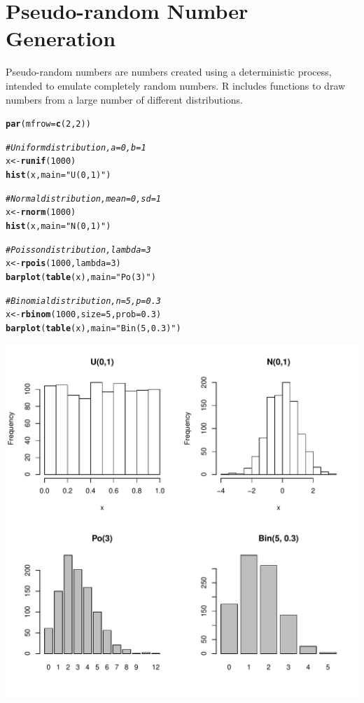 \documentclass{article}\usepackage[]{graphicx}\usepackage[]{color}
\makeatletter
\def\maxwidth{ %
  \ifdim\Gin@nat@width>\linewidth
    \linewidth
  \else
    \Gin@nat@width
  \fi
}
\newcommand{\hlnum}[1]{\textcolor[rgb]{0.686,0.059,0.569}{#1}}%
\newcommand{\hlstr}[1]{\textcolor[rgb]{0.192,0.494,0.8}{#1}}%
\newcommand{\hlcom}[1]{\textcolor[rgb]{0.678,0.584,0.686}{\textit{#1}}}%
\newcommand{\hlstd}[1]{\textcolor[rgb]{0.345,0.345,0.345}{#1}}%
\newcommand{\hlkwb}[1]{\textcolor[rgb]{0.69,0.353,0.396}{#1}}%
\newcommand{\hlkwc}[1]{\textcolor[rgb]{0.333,0.667,0.333}{#1}}%
\newcommand{\hlkwd}[1]{\textcolor[rgb]{0.737,0.353,0.396}{\textbf{#1}}}%
\newenvironment{kframe}{%
 \def\at@end@of@kframe{}%
 \ifinner\ifhmode%
  \def\at@end@of@kframe{\end{minipage}}%
  \begin{minipage}{\columnwidth}%
 \fi\fi%
 \def\FrameCommand##1{\hskip\@totalleftmargin \hskip-\fboxsep
 \colorbox{shadecolor}{##1}\hskip-\fboxsep
     \hskip-\linewidth \hskip-\@totalleftmargin \hskip\columnwidth}%
 \MakeFramed {\advance\hsize-\width
   \@totalleftmargin\z@ \linewidth\hsize
   \@setminipage}}%
 {\par\unskip\endMakeFramed%
 \at@end@of@kframe}
\newenvironment{knitrout}{}{} %
\makeatother
\begin{document}
\section{Pseudo-random Number Generation} \label{PRNG}
Pseudo-random numbers are numbers created using a deterministic process, intended to emulate completely random numbers. R includes functions to draw numbers from a large number of different distributions.
\begin{knitrout}
\color{fgcolor}\begin{kframe}
\begin{alltt}
\hlkwd{par}\hlstd{(}\hlkwc{mfrow} \hlstd{=} \hlkwd{c}\hlstd{(}\hlnum{2}\hlstd{,}\hlnum{2}\hlstd{))}

\hlcom{#Uniform distribution, a = 0, b = 1}
\hlstd{x} \hlkwb{<-} \hlkwd{runif}\hlstd{(}\hlnum{1000}\hlstd{)}
\hlkwd{hist}\hlstd{(x,} \hlkwc{main} \hlstd{=} \hlstr{"U(0,1)"}\hlstd{)}

\hlcom{#Normal distribution, mean = 0, sd = 1}
\hlstd{x} \hlkwb{<-} \hlkwd{rnorm}\hlstd{(}\hlnum{1000}\hlstd{)}
\hlkwd{hist}\hlstd{(x,} \hlkwc{main} \hlstd{=} \hlstr{"N(0,1)"}\hlstd{)}

\hlcom{#Poisson distribution, lambda = 3}
\hlstd{x} \hlkwb{<-} \hlkwd{rpois}\hlstd{(}\hlnum{1000}\hlstd{,} \hlkwc{lambda} \hlstd{=} \hlnum{3}\hlstd{)}
\hlkwd{barplot}\hlstd{(}\hlkwd{table}\hlstd{(x),} \hlkwc{main} \hlstd{=} \hlstr{"Po(3)"}\hlstd{)}

\hlcom{#Binomial distribution, n = 5, p = 0.3}
\hlstd{x} \hlkwb{<-} \hlkwd{rbinom}\hlstd{(}\hlnum{1000}\hlstd{,} \hlkwc{size} \hlstd{=} \hlnum{5}\hlstd{,} \hlkwc{prob} \hlstd{=} \hlnum{0.3}\hlstd{)}
\hlkwd{barplot}\hlstd{(}\hlkwd{table}\hlstd{(x),} \hlkwc{main} \hlstd{=} \hlstr{"Bin(5, 0.3)"}\hlstd{)}
\end{alltt}
\end{kframe}
\includegraphics[width=\maxwidth]{figure/unnamed-chunk-24-1} 

\end{knitrout}
\end{document}
